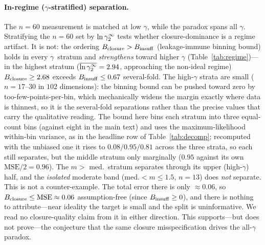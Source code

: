 \paragraph{In-regime ($\gamma$-stratified) separation.} The $n{=}60$ measurement is matched at low $\gamma$,
while the paradox spans all $\gamma$. Stratifying the $n{=}60$ set by $\lngi$
tests whether closure-dominance is a regime artifact. It is
not: the ordering $B_{\mathrm{closure}}>B_{\mathrm{insuff}}$ (leakage-immune binning bound) holds in every
$\gamma$~stratum and \emph{strengthens} toward higher $\gamma$ (Table~\ref{tab:regime})---in the
highest
stratum ($\overline{\ln\gamma_2^\infty}=2.94$, approaching the non-ideal regime) $B_{\mathrm{closure}}\ge2.68$ exceeds
$B_{\mathrm{insuff}}\le0.67$ several-fold. The high-$\gamma$ strata are small
($n=17$--$30$ in $102$ dimensions): the binning bound can be pushed toward zero by
too-few-points-per-bin, which mechanically widens the margin exactly where data is thinnest, so
it is the several-fold separations rather than the precise values that carry the
qualitative reading. The bound here bins each stratum into three equal-count bins (against eight in
the main text) and uses the maximum-likelihood within-bin variance, as in the
headline row of Table~\ref{tab:decomp}; recomputed with the unbiased one it rises to
$0.08/0.95/0.81$ across the three strata, so each still separates, but the middle stratum only
marginally ($0.95$ against its own $\mathrm{MSE}/2=0.96$). The $m>$ med.\ stratum separates
through its upper (high-$\gamma$) half, and the \emph{isolated} moderate band
(med.$<m\le1.5$, $n{=}13$) does \emph{not} separate. This is not a counter-example. The total error there
is only ${\approx}0.06$, so $B_{\mathrm{closure}}\le\mathrm{MSE}\approx0.06$ assumption-free (since $B_{\mathrm{insuff}}\ge0$),
and there is nothing to attribute---near ideality the target is small and the split is
uninformative. We read no closure-quality claim from it in either direction. This supports---but does
not prove---the conjecture that the same closure misspecification drives the all-$\gamma$ paradox.

\begin{table}[h]
\centering
\caption[The closure/insufficiency verdict across activity-coefficient strata]{Closure/insufficiency verdict across $\lngi$ strata of the matched set (residual-only
convention; $\Binsuf^{\mathrm{up}}$ is the leakage-immune binning bound throughout,
at the maximum-likelihood within-bin variance).}
\label{tab:regime}
\end{table}

